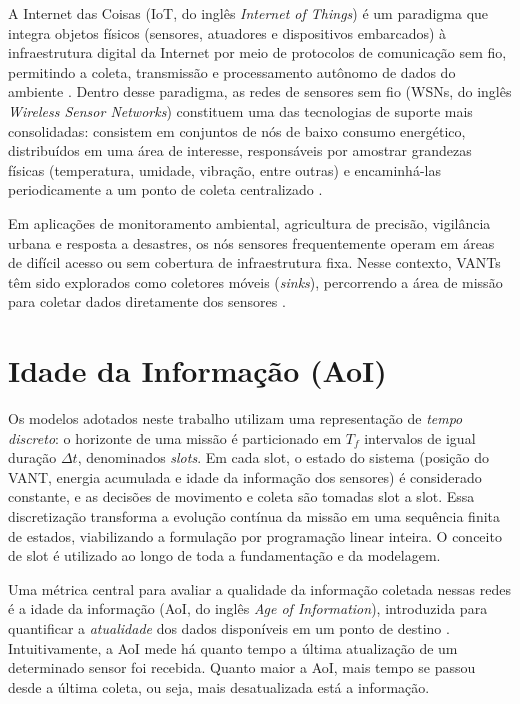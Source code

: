 A Internet das Coisas (IoT, do inglês \textit{Internet of Things}) é um paradigma que integra objetos físicos (sensores, atuadores e dispositivos embarcados) à infraestrutura digital da Internet por meio de protocolos de comunicação sem fio, permitindo a coleta, transmissão e processamento autônomo de dados do ambiente \cite{yang2020surveyUAVIoT}. Dentro desse paradigma, as redes de sensores sem fio (WSNs, do inglês \textit{Wireless Sensor Networks}) constituem uma das tecnologias de suporte mais consolidadas: consistem em conjuntos de nós de baixo consumo energético, distribuídos em uma área de interesse, responsáveis por amostrar grandezas físicas (temperatura, umidade, vibração, entre outras) e encaminhá-las periodicamente a um ponto de coleta centralizado \cite{liu2018uavWSN}.

Em aplicações de monitoramento ambiental, agricultura de precisão, vigilância urbana e resposta a desastres, os nós sensores frequentemente operam em áreas de difícil acesso ou sem cobertura de infraestrutura fixa. Nesse contexto, VANTs têm sido explorados como coletores móveis (\emph{sinks}), percorrendo a área de missão para coletar dados diretamente dos sensores \cite{messaoudi2023survey,wei2022survey}.

\section{Idade da Informação (AoI)}
\label{sec:aoi}

Os modelos adotados neste trabalho utilizam uma representação de \emph{tempo discreto}: o horizonte de uma missão é particionado em $T_f$ intervalos de igual duração $\Delta t$, denominados \emph{slots}. Em cada slot, o estado do sistema (posição do VANT, energia acumulada e idade da informação dos sensores) é considerado constante, e as decisões de movimento e coleta são tomadas slot a slot. Essa discretização transforma a evolução contínua da missão em uma sequência finita de estados, viabilizando a formulação por programação linear inteira. O conceito de slot é utilizado ao longo de toda a fundamentação e da modelagem.

Uma métrica central para avaliar a qualidade da informação coletada nessas redes é a idade da informação (AoI, do inglês \emph{Age of Information}), introduzida para quantificar a \emph{atualidade} dos dados disponíveis em um ponto de destino \cite{messaoudi2023survey}. Intuitivamente, a AoI mede há quanto tempo a última atualização de um determinado sensor foi recebida. Quanto maior a AoI, mais tempo se passou desde a última coleta, ou seja, mais desatualizada está a informação.

